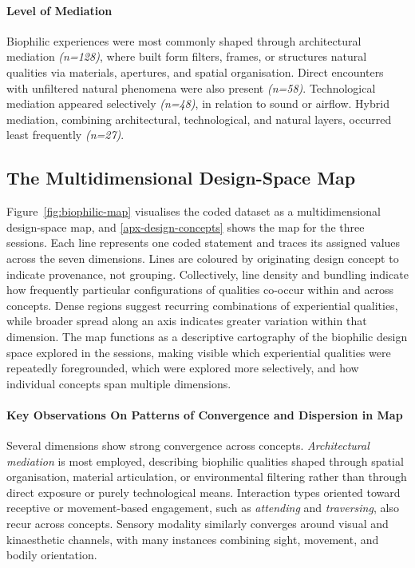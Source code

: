 \paragraph{Level of Mediation}
Biophilic experiences were most commonly shaped through architectural mediation \emph{(n=128)}, where built form filters, frames, or structures natural qualities via materials, apertures, and spatial organisation. Direct encounters with unfiltered natural phenomena were also present \emph{(n=58)}. Technological mediation appeared selectively \emph{(n=48)}, in relation to sound or airflow. Hybrid mediation, combining architectural, technological, and natural layers, occurred least frequently \emph{(n=27)}. 

\subsection{The Multidimensional Design-Space Map}
Figure~\ref{fig:biophilic-map} visualises the coded dataset as a multidimensional design-space map, and \autoref{apx-design-concepts} shows the map for the three sessions. Each line represents one coded statement and traces its assigned values across the seven dimensions. Lines are coloured by originating design concept to indicate provenance, not grouping. Collectively, line density and bundling indicate how frequently particular configurations of qualities co-occur within and across concepts. Dense regions suggest recurring combinations of experiential qualities, while broader spread along an axis indicates greater variation within that dimension. The map functions as a descriptive cartography of the biophilic design space explored in the sessions, making visible which experiential qualities were repeatedly foregrounded, which were explored more selectively, and how individual concepts span multiple dimensions. 



\paragraph{Key Observations On Patterns of Convergence and Dispersion in Map}
\label{subsec:ch5-key-observations}

Several dimensions show strong convergence across concepts. \emph{Architectural mediation} is most employed, describing biophilic qualities shaped through spatial organisation, material articulation, or environmental filtering rather than through direct exposure or purely technological means. Interaction types oriented toward receptive or movement-based engagement, such as \emph{attending} and \emph{traversing}, also recur across concepts. Sensory modality similarly converges around visual and kinaesthetic channels, with many instances combining sight, movement, and bodily orientation.

